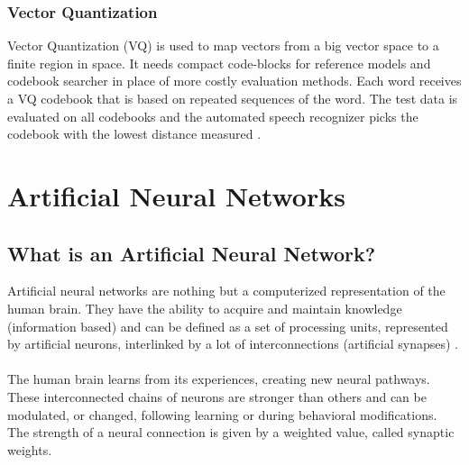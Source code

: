 \subsubsection{Vector Quantization}

Vector Quantization (VQ) is used to map vectors from a big vector space to a finite region in space. 
It needs compact code-blocks for reference models and codebook searcher in place of more costly evaluation methods. 
Each word receives a VQ codebook that is based on repeated sequences of the word.
The test data is evaluated on all codebooks and the automated speech recognizer picks the codebook with the lowest distance measured
\cite[p.~20-21]{togneri1990speech}.


\section{Artificial Neural Networks}\label{sec:ANN}
\subsection{What is an Artificial Neural Network?}
Artificial neural networks are nothing but a computerized representation of the human brain. 
They have the ability to acquire and maintain knowledge (information based) and can be defined as a set of processing units, represented by artificial neurons,
interlinked by a lot of interconnections
(artificial synapses) \cite[p.~5]{Silva2016}.\\\\
The human brain learns from its experiences, creating new neural pathways. These interconnected chains of neurons are stronger than others and can be modulated, or changed,
following learning or during behavioral modifications.
The strength of a neural connection is given by a weighted value, called synaptic weights.

